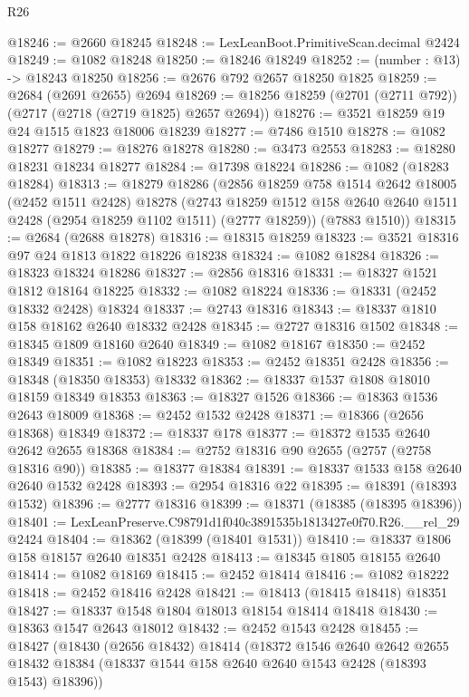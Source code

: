 \begin{lexlean}{R26}
\begin{coremodule}
@18246 := @2660 @18245
@18248 := LexLeanBoot.PrimitiveScan.decimal @2424
@18249 := @1082 @18248
@18250 := @18246 @18249
@18252 := (number : @13) -> @18243 @18250
@18256 := @2676 @792 @2657 @18250 @1825
@18259 := @2684 (@2691 @2655) @2694
@18269 := @18256 @18259 (@2701 (@2711 @792)) (@2717 (@2718 (@2719 @1825) @2657 @2694))
@18276 := @3521 @18259 @19 @24 @1515 @1823 @18006 @18239
@18277 := @7486 @1510
@18278 := @1082 @18277
@18279 := @18276 @18278
@18280 := @3473 @2553
@18283 := @18280 @18231 @18234 @18277
@18284 := @17398 @18224
@18286 := @1082 (@18283 @18284)
@18313 := @18279
    @18286
    (@2856
      @18259
      @758
      @1514
      @2642
      @18005
      (@2452 @1511 @2428)
      @18278
      (@2743 @18259 @1512 @158 @2640 @2640 @1511 @2428 (@2954 @18259 @1102 @1511) (@2777 @18259))
      (@7883 @1510))
@18315 := @2684 (@2688 @18278)
@18316 := @18315 @18259
@18323 := @3521 @18316 @97 @24 @1813 @1822 @18226 @18238
@18324 := @1082 @18284
@18326 := @18323 @18324 @18286
@18327 := @2856 @18316
@18331 := @18327 @1521 @1812 @18164 @18225
@18332 := @1082 @18224
@18336 := @18331 (@2452 @18332 @2428) @18324
@18337 := @2743 @18316
@18343 := @18337 @1810 @158 @18162 @2640 @18332 @2428
@18345 := @2727 @18316 @1502
@18348 := @18345 @1809 @18160 @2640
@18349 := @1082 @18167
@18350 := @2452 @18349
@18351 := @1082 @18223
@18353 := @2452 @18351 @2428
@18356 := @18348 (@18350 @18353) @18332
@18362 := @18337 @1537 @1808 @18010 @18159 @18349 @18353
@18363 := @18327 @1526
@18366 := @18363 @1536 @2643 @18009
@18368 := @2452 @1532 @2428
@18371 := @18366 (@2656 @18368) @18349
@18372 := @18337 @178
@18377 := @18372 @1535 @2640 @2642 @2655 @18368
@18384 := @2752 @18316 @90 @2655 (@2757 (@2758 @18316 @90))
@18385 := @18377 @18384
@18391 := @18337 @1533 @158 @2640 @2640 @1532 @2428
@18393 := @2954 @18316 @22
@18395 := @18391 (@18393 @1532)
@18396 := @2777 @18316
@18399 := @18371 (@18385 (@18395 @18396))
@18401 := LexLeanPreserve.C98791d1f040c3891535b1813427e0f70.R26.__rel_29 @2424
@18404 := @18362 (@18399 (@18401 @1531))
@18410 := @18337 @1806 @158 @18157 @2640 @18351 @2428
@18413 := @18345 @1805 @18155 @2640
@18414 := @1082 @18169
@18415 := @2452 @18414
@18416 := @1082 @18222
@18418 := @2452 @18416 @2428
@18421 := @18413 (@18415 @18418) @18351
@18427 := @18337 @1548 @1804 @18013 @18154 @18414 @18418
@18430 := @18363 @1547 @2643 @18012
@18432 := @2452 @1543 @2428
@18455 := @18427
    (@18430
      (@2656 @18432)
      @18414
      (@18372
        @1546
        @2640
        @2642
        @2655
        @18432
        @18384
        (@18337 @1544 @158 @2640 @2640 @1543 @2428 (@18393 @1543) @18396))

\end{coremodule}
\end{lexlean}
